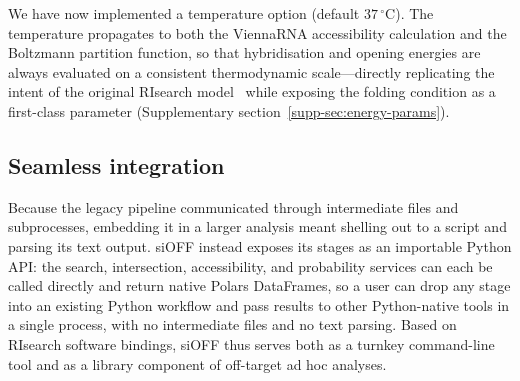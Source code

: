 \documentclass[unnumsec,webpdf,contemporary,large]{oup-authoring-template}
\begin{document}
We have now implemented a temperature option (default $37\,^\circ$C). The temperature propagates to both the ViennaRNA accessibility calculation and the Boltzmann partition function, so that hybridisation and opening energies are always evaluated on a consistent thermodynamic scale---directly replicating the intent of the original RIsearch model~\citep{wenzel2012risearch} while exposing the folding condition as a first-class parameter (Supplementary section~\ref*{supp-sec:energy-params}).

\subsection*{Seamless integration}
Because the legacy pipeline communicated through intermediate files and subprocesses, embedding it in a larger analysis meant shelling out to a script and parsing its text output.
siOFF instead exposes its stages as an importable Python API: the search, intersection, accessibility, and probability services can each be called directly and return native Polars DataFrames, so a user can drop any stage into an existing Python workflow and pass results to other Python-native tools in a single process, with no intermediate files and no text parsing.
Based on RIsearch software bindings, siOFF thus serves both as a turnkey command-line tool and as a library component of off-target ad hoc analyses.
 
\end{document}
